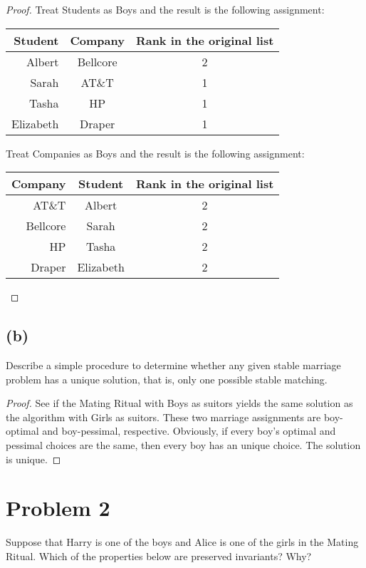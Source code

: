 \documentclass[14pt]{extarticle}
\begin{document}
\begin{proof}
Treat Students as Boys and the result is the following assignment:

\begin{center}
\begin{tabular}{r|c|c}
Student & Company & Rank in the original list\\
\hline
Albert & Bellcore & 2\\
Sarah & AT\&T & 1\\
Tasha & HP & 1\\
Elizabeth & Draper & 1
\end{tabular}
\end{center}

Treat Companies as Boys and the result is the following assignment:

\begin{center}
\begin{tabular}{r|c|c}
Company & Student & Rank in the original list\\
\hline
AT\&T & Albert & 2\\
Bellcore & Sarah & 2\\
HP & Tasha & 2\\
Draper & Elizabeth & 2
\end{tabular}
\end{center}
\end{proof}

\subsection{(b)}
Describe a simple procedure to determine whether any given stable marriage problem has a unique solution, that is, only one possible stable matching.
\begin{proof}
See if the Mating Ritual with Boys as suitors yields the same solution as the algorithm with Girls as suitors. These two marriage assignments are boy-optimal and boy-pessimal, respec­tive. Obviously, if every boy’s optimal and pessimal choices are the same, then every boy has an unique choice. The solution is unique.
\end{proof}

\section{Problem 2}
Suppose that Harry is one of the boys and Alice is one of the girls in the Mating Ritual. Which of the properties below are preserved invariants? Why?
\end{document}
